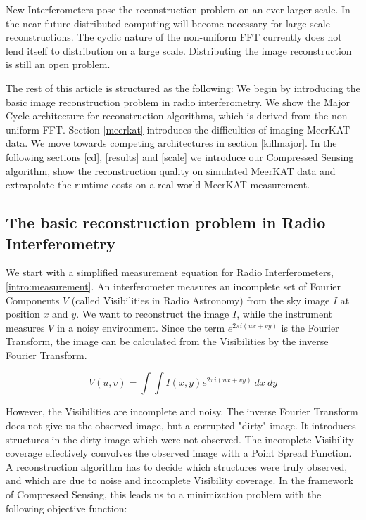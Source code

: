 New Interferometers pose the reconstruction problem on an ever larger scale. In the near future distributed computing will become necessary for large scale reconstructions. The cyclic nature of the non-uniform FFT currently does not lend itself to distribution on a large scale. Distributing the image reconstruction is still an open problem.

The rest of this article is structured as the following: We begin by introducing the basic image reconstruction problem in radio interferometry. We show the Major Cycle architecture for reconstruction algorithms, which is derived from the non-uniform FFT.  Section \ref{meerkat} introduces the difficulties of imaging MeerKAT data. We  move towards competing architectures in section \ref{killmajor}. In the following sections \ref{cd}, \ref{results} and \ref{scale} we introduce our Compressed Sensing algorithm, show the reconstruction quality on simulated MeerKAT data and extrapolate the runtime costs on a real world MeerKAT measurement.

\subsection{The basic reconstruction problem in Radio Interferometry}\label{intro:basic}
We start with a simplified measurement equation for Radio Interferometers, \eqref{intro:measurement}. An interferometer measures an incomplete set of Fourier Components $V$ (called Visibilities in Radio Astronomy) from the sky image $I$ at position $x$ and $y$. We want to reconstruct the image $I$, while the instrument measures $V$ in a noisy environment. Since the term $e^{2 \pi i (ux+vy)}$ is the Fourier Transform, the image can be calculated from the Visibilities by the inverse Fourier Transform.

\begin{equation}\label{intro:measurement}
V(u, v) = \int\int I(x, y) e^{2 \pi i (ux+vy)} \: dx \: dy
\end{equation}

However, the Visibilities are incomplete and noisy. The inverse Fourier Transform does not give us the observed image, but a corrupted "dirty" image.  It introduces structures in the dirty image which were not observed. The incomplete Visibility coverage effectively convolves the observed image with a Point Spread Function. A reconstruction algorithm has to decide which structures were truly observed, and which are due to noise and incomplete Visibility coverage. In the framework of Compressed Sensing, this leads us to a minimization problem with the following objective function:

